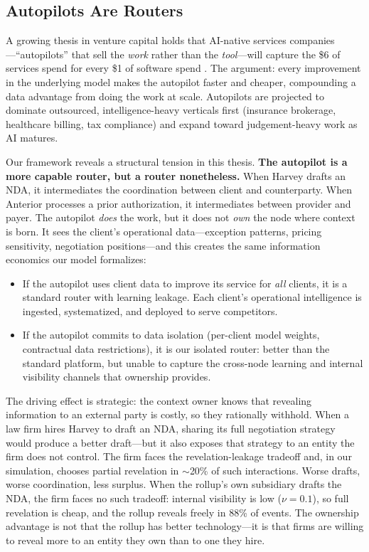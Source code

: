 \documentclass[12pt]{article}
\theoremstyle{definition}
\begin{document}
\subsection{Autopilots Are Routers}

A growing thesis in venture capital holds that AI-native services companies---``autopilots'' that sell the \textit{work} rather than the \textit{tool}---will capture the \$6 of services spend for every \$1 of software spend \citep{sequoia2025services}. The argument: every improvement in the underlying model makes the autopilot faster and cheaper, compounding a data advantage from doing the work at scale. Autopilots are projected to dominate outsourced, intelligence-heavy verticals first (insurance brokerage, healthcare billing, tax compliance) and expand toward judgement-heavy work as AI matures.

Our framework reveals a structural tension in this thesis. \textbf{The autopilot is a more capable router, but a router nonetheless.} When Harvey drafts an NDA, it intermediates the coordination between client and counterparty. When Anterior processes a prior authorization, it intermediates between provider and payer. The autopilot \textit{does} the work, but it does not \textit{own} the node where context is born. It sees the client's operational data---exception patterns, pricing sensitivity, negotiation positions---and this creates the same information economics our model formalizes:

\begin{itemize}[leftmargin=*]
\item If the autopilot uses client data to improve its service for \textit{all} clients, it is a standard router with learning leakage. Each client's operational intelligence is ingested, systematized, and deployed to serve competitors.

\item If the autopilot commits to data isolation (per-client model weights, contractual data restrictions), it is our isolated router: better than the standard platform, but unable to capture the cross-node learning and internal visibility channels that ownership provides.
\end{itemize}

\noindent The driving effect is strategic: the context owner knows that revealing information to an external party is costly, so they rationally withhold. When a law firm hires Harvey to draft an NDA, sharing its full negotiation strategy would produce a better draft---but it also exposes that strategy to an entity the firm does not control. The firm faces the revelation-leakage tradeoff and, in our simulation, chooses partial revelation in $\sim$20\% of such interactions. Worse drafts, worse coordination, less surplus. When the rollup's own subsidiary drafts the NDA, the firm faces no such tradeoff: internal visibility is low ($\nu = 0.1$), so full revelation is cheap, and the rollup reveals freely in 88\% of events. The ownership advantage is not that the rollup has better technology---it is that firms are willing to reveal more to an entity they own than to one they hire.
\end{document}
